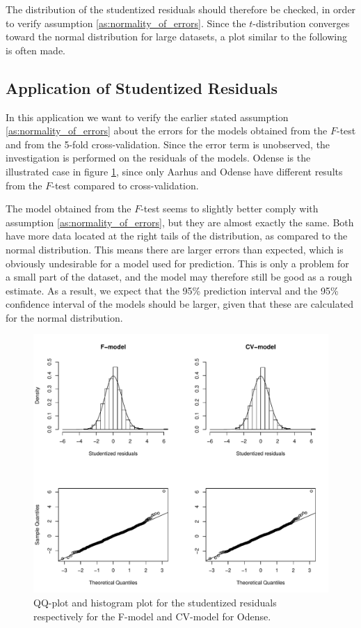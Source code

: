 The distribution of the studentized residuals should therefore be checked, in order to verify assumption \ref{as:normality_of_errors}. 
Since the $t$-distribution converges toward the normal distribution for large datasets, a plot similar to the following is often made.

\subsection{Application of Studentized Residuals} \label{sub:residuals}

In this application we want to verify the earlier stated assumption \ref{as:normality_of_errors} about the errors for the models obtained from the $F$-test and from the 5-fold cross-validation. 
Since the error term is unobserved, the investigation is performed on the residuals of the models.
Odense is the illustrated case in figure \ref{fig:studentized_res_plot}, since only Aarhus and Odense have different results from the $F$-test compared to cross-validation.

The model obtained from the $F$-test seems to slightly better comply with assumption \ref{as:normality_of_errors}, but they are almost exactly the same. Both have more data located at the right tails of the distribution, as compared to the normal distribution. 
This means there are larger errors than expected, which is obviously undesirable for a model used for prediction. 
This is only a problem for a small part of the dataset, and the model may therefore still be good as a rough estimate. 
As a result, we expect that the 95\% prediction interval and the 95\% confidence interval of the models should be larger, given that these are calculated for the normal distribution.

    \begin{figure}[H]
        \centering
      \includegraphics[width = 0.95 \textwidth]{figures/Nanna/studentized_res_plot.pdf}
      \caption{QQ-plot and histogram plot for the studentized residuals respectively for the F-model and CV-model for Odense.}
      \label{fig:studentized_res_plot}
    \end{figure}

